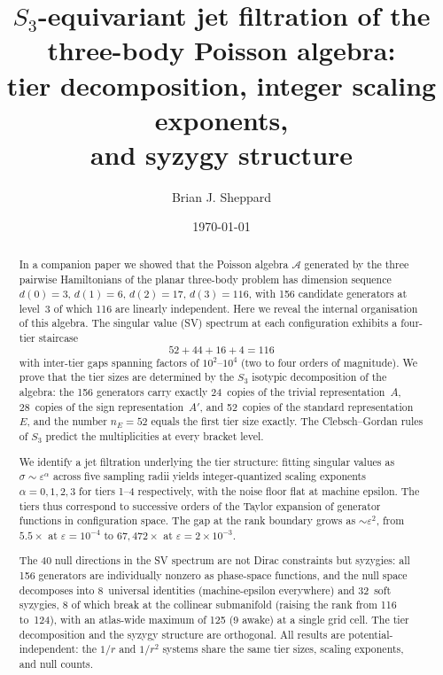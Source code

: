 \documentclass[11pt,a4paper]{article}
\title{$S_3$-equivariant jet filtration of the\\
three-body Poisson algebra:\\
tier decomposition, integer scaling exponents,\\
and syzygy structure}
\author{Brian J. Sheppard}
\date{\today}
\theoremstyle{remark}
\newcommand{\cA}{\mathcal{A}}
\newcommand{\SG}{S_3}
\begin{document}
\maketitle

\begin{abstract}
In a companion paper we showed that the Poisson algebra
$\cA$ generated by the three pairwise Hamiltonians of the
planar three-body problem has dimension sequence
$d(0)=3$, $d(1)=6$, $d(2)=17$, $d(3)=116$,
with 156 candidate generators at level~3 of which 116
are linearly independent.  Here we reveal the internal
organisation of this algebra.  The singular value (SV)
spectrum at each configuration exhibits a four-tier
staircase
\[
  52 + 44 + 16 + 4 = 116
\]
with inter-tier gaps spanning factors of $10^{2}$--$10^{4}$
(two to four orders of magnitude).  We prove that the tier sizes are determined
by the $\SG$ isotypic decomposition of the algebra:
the 156 generators carry exactly 24~copies of the
trivial representation~$A$, 28~copies of the sign
representation~$A'$, and 52~copies of the standard
representation~$E$, and the number $n_E = 52$ equals
the first tier size exactly.  The Clebsch--Gordan rules
of $\SG$ predict the multiplicities at every bracket level.

We identify a jet filtration underlying the tier
structure: fitting singular values as $\sigma \sim
\varepsilon^\alpha$ across five sampling radii yields
integer-quantized scaling exponents
$\alpha = 0, 1, 2, 3$ for tiers 1--4 respectively,
with the noise floor flat at machine epsilon.
The tiers thus correspond to successive orders of the
Taylor expansion of generator functions in configuration
space.  The gap at the rank boundary grows as
$\sim\!\varepsilon^2$, from $5.5\times$ at
$\varepsilon=10^{-4}$ to $67{,}472\times$ at
$\varepsilon=2\times 10^{-3}$.

The 40 null directions in the SV spectrum are not
Dirac constraints but syzygies: all 156 generators are
individually nonzero as phase-space functions, and the
null space decomposes into 8~universal identities
(machine-epsilon everywhere) and 32~soft syzygies, 8 of
which break at the collinear submanifold (raising the
rank from 116 to~124), with an atlas-wide maximum of 125
(9 awake) at a single grid cell.  The tier decomposition and the
syzygy structure are orthogonal.  All results are
potential-independent: the $1/r$ and $1/r^2$ systems
share the same tier sizes, scaling exponents, and null
counts.
\end{abstract}


\end{document}
